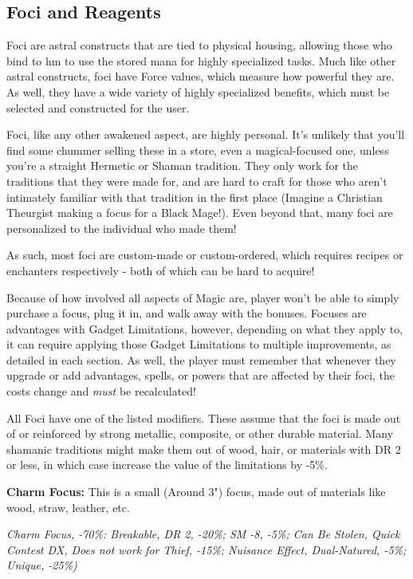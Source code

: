 \begin{multicols*}{2}
	
	\subsection{Foci and Reagents}
	
	Foci are astral constructs that are tied to physical housing, allowing those who bind to hm to use the stored mana for highly specialized tasks. Much like other astral constructs, foci have Force values, which measure how powerful they are. As well, they have a wide variety of highly specialized benefits, which must be selected and constructed for the user.
	
	Foci, like any other awakened aspect, are highly personal. It's unlikely that you'll find some chummer selling these in a store, even a magical-focused one, unless you're a straight Hermetic or Shaman tradition. They only work for the traditions that they were made for, and are hard to craft for those who aren't intimately familiar with that tradition in the first place (Imagine a Christian Theurgist making a focus for a Black Mage!). Even beyond that, many foci are personalized to the individual who made them!
	
	As such, most foci are custom-made or custom-ordered, which requires recipes or enchanters respectively - both of which can be hard to acquire!
	
	Because of how involved all aspects of Magic are, player won't be able to simply purchase a focus, plug it in, and walk away with the bonuses. Focuses are advantages with Gadget Limitations, however, depending on what they apply to, it can require applying those Gadget Limitations to multiple improvements, as detailed in each section. As well, the player must remember that whenever they upgrade or add advantages, spells, or powers that are affected by their foci, the costs change and \textit{must} be recalculated!
	
	All Foci have one of the listed modifiers. These assume that the foci is made out of or reinforced by strong metallic, composite, or other durable material. Many shamanic traditions might make them out of wood, hair, or materials with DR 2 or less, in which case increase the value of the limitations by -5\%.
	
	\textbf{Charm Focus:} This is a small (Around 3") focus, made out of materials like wood, straw, leather, etc.
	
	\textcolor{OliveGreen}{\textit{Charm Focus, -70\%: Breakable, DR 2, -20\%; SM -8, -5\%; Can Be Stolen, Quick Contest DX, Does not work for Thief, -15\%; Nuisance Effect, Dual-Natured, -5\%; Unique, -25\%)}}
	

\end{multicols*}
